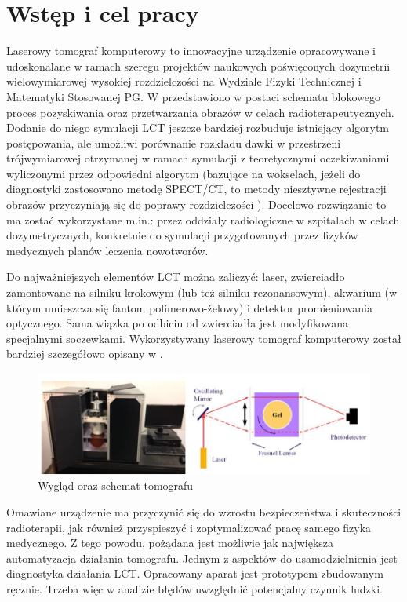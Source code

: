 \chapter{Wstęp i cel pracy} 

Laserowy tomograf komputerowy to innowacyjne urządzenie opracowywane i udoskonalane w ramach szeregu projektów naukowych poświęconych dozymetrii wielowymiarowej wysokiej rozdzielczości na Wydziale Fizyki Technicznej i Matematyki Stosowanej PG. W \cite{algo} przedstawiono w postaci schematu blokowego proces pozyskiwania oraz przetwarzania obrazów w celach radioterapeutycznych. Dodanie do niego symulacji LCT jeszcze bardziej rozbuduje istniejący algorytm postępowania, ale umożliwi porównanie rozkładu dawki w przestrzeni trójwymiarowej otrzymanej w ramach symulacji z teoretycznymi oczekiwaniami wyliczonymi przez odpowiedni algorytm (bazujące na wokselach, jeżeli do diagnostyki zastosowano metodę SPECT/CT, to metody niesztywne rejestracji obrazów przyczyniają się do poprawy rozdzielczości \cite{image}). Docelowo rozwiązanie to ma zostać wykorzystane m.in.: przez oddziały radiologiczne w szpitalach w celach dozymetrycznych, konkretnie do symulacji przygotowanych przez fizyków medycznych planów leczenia nowotworów. 

Do najważniejszych elementów LCT można zaliczyć: laser, zwierciadło zamontowane na silniku krokowym (lub też silniku rezonansowym), akwarium (w którym umieszcza się fantom polimerowo-żelowy) i detektor promieniowania optycznego. Sama wiązka po odbiciu od zwierciadła jest modyfikowana specjalnymi soczewkami. Wykorzystywany laserowy tomograf komputerowy został bardziej szczegółowo opisany w \cite{Mar}.

\begin{figure}[H]
    \centering
    \includegraphics[width=\textwidth]{pictures/LCT_diagram.png}
    \caption{Wygląd oraz schemat tomografu \cite{Mar}}
    \label{fig:LCT}
\end{figure}

Omawiane urządzenie ma przyczynić się do wzrostu bezpieczeństwa i skuteczności radioterapii, jak również przyspieszyć i zoptymalizować pracę samego fizyka medycznego. Z tego powodu, pożądana jest możliwie jak największa automatyzacja działania tomografu. Jednym z aspektów do usamodzielnienia jest diagnostyka działania LCT. Opracowany aparat jest prototypem zbudowanym ręcznie. Trzeba więc w analizie błędów uwzględnić potencjalny czynnik ludzki.

